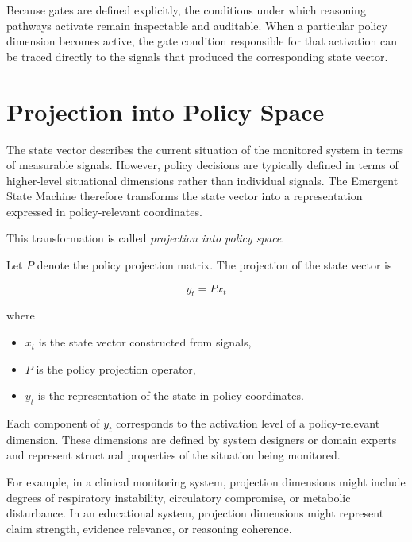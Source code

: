 \documentclass[11pt]{article}
\begin{document}
Because gates are defined explicitly, the conditions under which reasoning pathways activate remain inspectable and auditable. When a particular policy dimension becomes active, the gate condition responsible for that activation can be traced directly to the signals that produced the corresponding state vector.





\section{Projection into Policy Space}

The state vector describes the current situation of the monitored system in terms of measurable signals. However, policy decisions are typically defined in terms of higher-level situational dimensions rather than individual signals. The Emergent State Machine therefore transforms the state vector into a representation expressed in policy-relevant coordinates.

This transformation is called \emph{projection into policy space}.

Let $P$ denote the policy projection matrix. The projection of the state vector is

\begin{equation}
y_t = P x_t
\end{equation}

where

\begin{itemize}
\item $x_t$ is the state vector constructed from signals,
\item $P$ is the policy projection operator,
\item $y_t$ is the representation of the state in policy coordinates.
\end{itemize}

Each component of $y_t$ corresponds to the activation level of a policy-relevant dimension. These dimensions are defined by system designers or domain experts and represent structural properties of the situation being monitored.

For example, in a clinical monitoring system, projection dimensions might include degrees of respiratory instability, circulatory compromise, or metabolic disturbance. In an educational system, projection dimensions might represent claim strength, evidence relevance, or reasoning coherence.
\end{document}
